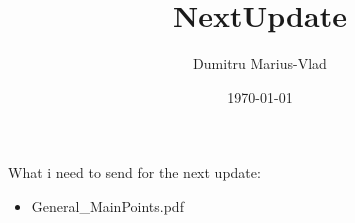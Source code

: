 \documentclass[12pt]{article}
\title{NextUpdate}
\author{Dumitru Marius-Vlad}
\date{\today}
\begin{document}
\maketitle

What i need to send for the next update:
\begin{itemize}
    \item General\_MainPoints.pdf
\end{itemize}
\end{document}
